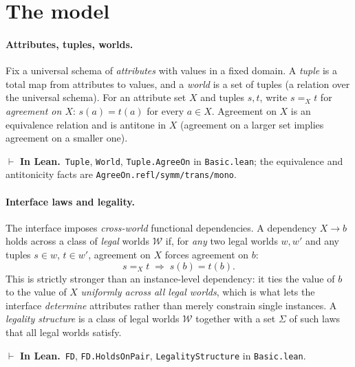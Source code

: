 \documentclass[11pt]{article}
\newcommand{\W}{\mathcal{W}}                 %
\newcommand{\lean}[1]{\texttt{#1}}           %
\theoremstyle{plain}
\theoremstyle{definition}
\newcommand{\inlean}[1]{\par\smallskip\noindent%
  {\small\textcolor{blue!50!black}{$\vdash$ \textbf{In Lean.}}~#1}\par\smallskip}
\begin{document}
\tableofcontents

\section{The model}\label{sec:model}

\paragraph{Attributes, tuples, worlds.}
Fix a universal schema of \emph{attributes} with values in a fixed domain. A \emph{tuple} is a
total map from attributes to values, and a \emph{world} is a set of tuples (a relation over the
universal schema). For an attribute set $X$ and tuples $s,t$, write $s =_X t$ for
\emph{agreement on $X$}: $s(a)=t(a)$ for every $a\in X$. Agreement on $X$ is an equivalence
relation and is antitone in $X$ (agreement on a larger set implies agreement on a smaller one).
\inlean{\lean{Tuple}, \lean{World}, \lean{Tuple.AgreeOn} in \lean{Basic.lean}; the
equivalence and antitonicity facts are \lean{AgreeOn.refl/symm/trans/mono}.}

\paragraph{Interface laws and legality.}
The interface imposes \emph{cross-world} functional dependencies. A dependency
$X\to b$ holds across a class of \emph{legal} worlds $\W$ if, for \emph{any} two legal worlds
$w,w'$ and any tuples $s\in w$, $t\in w'$, agreement on $X$ forces agreement on $b$:
\[
  s =_X t \;\Longrightarrow\; s(b)=t(b).
\]
This is strictly stronger than an instance-level dependency: it ties the value of $b$ to the
value of $X$ \emph{uniformly across all legal worlds}, which is what lets the interface
\emph{determine} attributes rather than merely constrain single instances. A \emph{legality
structure} is a class of legal worlds $\W$ together with a set $\Sigma$ of such laws that all
legal worlds satisfy.
\inlean{\lean{FD}, \lean{FD.HoldsOnPair}, \lean{LegalityStructure} in \lean{Basic.lean}.}
\end{document}

